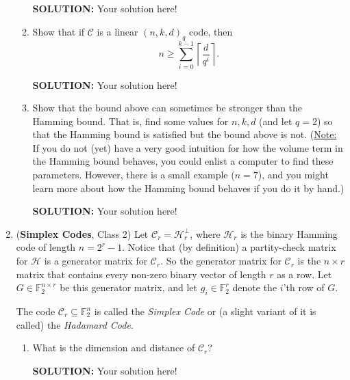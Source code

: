 \documentclass{article}
\newcommand{\cC}{\mathcal{C}}
\newcommand{\F}{\mathbb{F}}
\begin{document}
\begin{enumerate}
\begin{enumerate}
\begin{shaded}
\textbf{SOLUTION:}
Your solution here!
\end{shaded}

\item Show that if $\cC$ is a linear $(n,k,d)_q$ code, then 
\[n \geq \sum_{i=0}^{k-1} \left\lceil \frac{ d}{q^i} \right\rceil.\]

\begin{shaded}
\textbf{SOLUTION:}
Your solution here!
\end{shaded}

\item Show that the bound above can sometimes be stronger than the Hamming bound.  That is, find 
	some values for $n,k,d$ (and let $q=2$) so that the Hamming bound is satisfied but the bound above is not.
(\underline{Note:} If you do not (yet) have a very good intuition for how the volume term in the Hamming bound behaves, you could enlist a computer to find these parameters.  However, there is a small example ($n=7$), and you might learn more about how the Hamming bound behaves if you do it by hand.)


\begin{shaded}
\textbf{SOLUTION:}
Your solution here!
\end{shaded}
\end{enumerate}



\item (\textbf{Simplex Codes}, Class 2)  Let $\cC_r = \mathcal{H}_r^\perp$, where $\mathcal{H}_r$ is the binary Hamming code of length $n = 2^r - 1$.   
Notice that (by definition) a partity-check matrix for $\mathcal{H}$ is a generator matrix for $\cC_r$.  So the generator matrix for $\cC_r$ is the $n \times r$ matrix that contains every non-zero binary vector of length $r$ as a row.  Let $G \in \F_2^{n \times r}$ be this generator matrix, and let $g_i \in \F_2^r$ denote the $i$'th row of $G$.

The code $\cC_r \subseteq \F_2^n$ is called the \emph{Simplex Code} or (a slight variant of it is called) the \emph{Hadamard Code}.

\begin{enumerate}
\item What is the dimension and distance of $\cC_r$?


\begin{shaded}
\textbf{SOLUTION:}
Your solution here!
\end{shaded}


\end{enumerate}
\end{enumerate}
\end{document}
